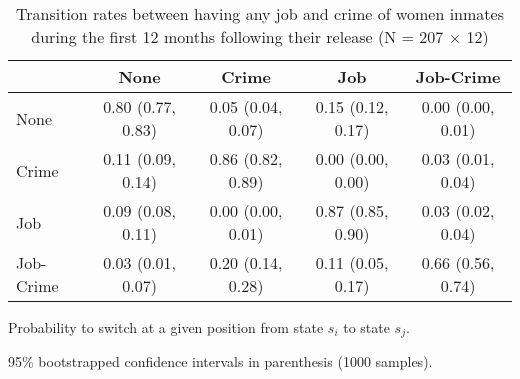 \begin{table}[htp]
\scriptsize
\setlength{\tabcolsep}{10pt}
\renewcommand{\arraystretch}{1.3}
\begin{threeparttable}
\centering
\caption{Transition rates between having any job and crime of women inmates \newline
    during the first 12 months following their release (N = 207 $\times$ 12)} 
\label{tab:transition_rates_anyjob_crime}
\begin{tabular}{lcccc}
  \hline
 & None & Crime & Job & Job-Crime \\ 
  \hline
None & 0.80 (0.77, 0.83) & 0.05 (0.04, 0.07) & 0.15 (0.12, 0.17) & 0.00 (0.00, 0.01) \\ 
  Crime & 0.11 (0.09, 0.14) & 0.86 (0.82, 0.89) & 0.00 (0.00, 0.00) & 0.03 (0.01, 0.04) \\ 
  Job & 0.09 (0.08, 0.11) & 0.00 (0.00, 0.01) & 0.87 (0.85, 0.90) & 0.03 (0.02, 0.04) \\ 
  Job-Crime & 0.03 (0.01, 0.07) & 0.20 (0.14, 0.28) & 0.11 (0.05, 0.17) & 0.66 (0.56, 0.74) \\ 
   \hline
\end{tabular}
\begin{tablenotes}
\scriptsize
\item Probability to switch at a given position from state $s_i$ to state $s_j$. 
    \item 95\% bootstrapped confidence intervals in parenthesis (1000 samples).
\end{tablenotes}
\end{threeparttable}
\end{table}
